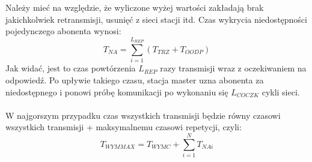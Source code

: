 	Należy mieć na względzie, że wyliczone wyżej wartości zakładają brak jakichkolwiek retransmisji, usunięć z sieci stacji itd. Czas wykrycia niedostępności pojedynczego abonenta wynosi:
	\begin{equation}
		\label{eq:czasNiedost}
		T_{NA} = \sum\limits_{i=1}^{L_{REP}}(T_{TRZ} + T_{OODP})
	\end{equation}
	Jak widać, jest to czas powtórzenia $ L_{REP} $ razy transmisji wraz z oczekiwaniem na odpowiedź. Po upływie takiego czasu, stacja master uzna abonenta za niedostępnego i ponowi próbę komunikacji po wykonaniu się $ L_{COCZK} $ cykli sieci.\\
	\\
	W najgorszym przypadku czas wszystkich transmisji będzie równy czasowi wszystkich transmisji + maksymalnemu czasowi repetycji, czyli:
	\begin{equation}
		\label{eq:czasMAX}
		T_{WYMMAX} = T_{WYMC} + \sum\limits_{i=1}^N T_{NAi}
	\end{equation}
